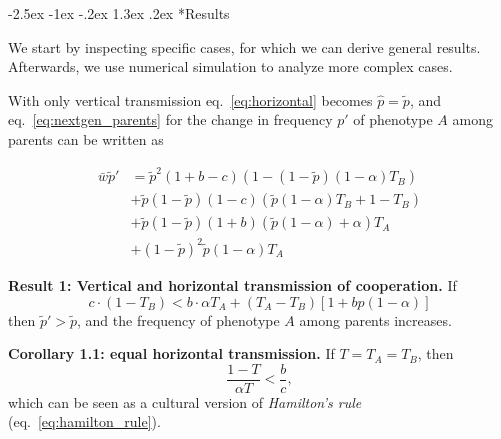 \documentclass[12pt]{extarticle}
\makeatletter
\renewcommand\section{\@startsection {section}{1}{\z@}%
     {-2.5ex \@plus -1ex \@minus -.2ex}%
     {1.3ex \@plus.2ex}%
    {\Large\bfseries}}
\makeatother
\begin{document}
\section*{Results}

We start by inspecting specific cases, for which we can derive general results. 
Afterwards, we use numerical simulation to analyze more complex cases.

With only vertical transmission eq.~\ref{eq:horizontal} becomes
$\hat{p} =  \tilde{p}$,
and eq.~\ref{eq:nextgen_parents} for the change in frequency $p'$ of phenotype $A$ among parents can be written as

\begin{equation} 
\begin{split}\label{eq:nextgen_parents_vertical_only}
\bar{w} \tilde{p}' 
& = \tilde{p}^2 (1+b-c) (1 - (1-\tilde{p}) (1-\alpha) T_B) \\
& + \tilde{p}(1-\tilde{p}) (1-c) (\tilde{p} (1-\alpha) T_B + 1 - T_B) \\
& + \tilde{p}(1-\tilde{p}) (1+b) (\tilde{p} (1-\alpha) + \alpha) T_A \\
& + (1-\tilde{p})^2 \tilde{p} (1-\alpha) T_A
\end{split}
\end{equation}

\textbf{Result 1: Vertical and horizontal transmission of cooperation.}
If 
\begin{equation}\label{eq:unequal_transmission}
c \cdot (1-T_B) < b \cdot  \alpha T_A  + (T_A - T_B) [1 + bp(1-\alpha)]
\end{equation}
then $\tilde{p}' > \tilde{p}$, and the frequency of phenotype $A$ among parents increases. 

\textbf{Corollary 1.1: equal horizontal transmission.}
If $T=T_A=T_B$, then
\begin{equation}
\label{eq:equal_transmission}
\frac{1-T}{\alpha T} < \frac{b}{c},
\end{equation}
which can be seen as a cultural version of \emph{Hamilton's rule} (eq.~\ref{eq:hamilton_rule}).

	
\end{document}
